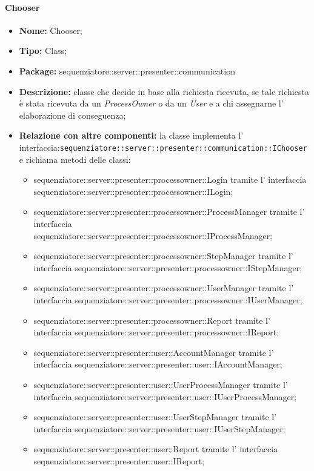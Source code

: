 \paragraph{Chooser}
	\begin{itemize}
		\item \textbf{Nome:} Chooser;
		\item \textbf{Tipo:} Class;
		\item \textbf{Package:} sequenziatore::server::presenter::communication
		\item \textbf{Descrizione:} classe che decide in base alla richiesta ricevuta, se tale richiesta è stata ricevuta da un \textit{ProcessOwner} o da un \textit{User} e a chi assegnarne l' elaborazione di conseguenza;
		\item \textbf{Relazione con altre componenti:} la classe implementa l' interfaccia:\texttt{sequenziatore::server::presenter::communication::IChooser} e richiama metodi delle classi:
		\begin{itemize}
			\item sequenziatore::server::presenter::processowner::Login tramite l' interfaccia sequenziatore::server::presenter::processowner::ILogin;
			\item sequenziatore::server::presenter::processowner::ProcessManager tramite l' interfaccia sequenziatore::server::presenter::processowner::IProcessManager;
			\item sequenziatore::server::presenter::processowner::StepManager tramite l' interfaccia sequenziatore::server::presenter::processowner::IStepManager;
			\item sequenziatore::server::presenter::processowner::UserManager tramite l' interfaccia sequenziatore::server::presenter::processowner::IUserManager;
			\item sequenziatore::server::presenter::processowner::Report tramite l' interfaccia
sequenziatore::server::presenter::processowner::IReport;
			\item sequenziatore::server::presenter::user::AccountManager tramite l' interfaccia			sequenziatore::server::presenter::user::IAccountManager;
			\item sequenziatore::server::presenter::user::UserProcessManager tramite l' interfaccia sequenziatore::server::presenter::user::IUserProcessManager;
			\item sequenziatore::server::presenter::user::UserStepManager tramite l' interfaccia sequenziatore::server::presenter::user::IUserStepManager;
			\item sequenziatore::server::presenter::user::Report tramite l' interfaccia sequenziatore::server::presenter::user::IReport;
		\end{itemize}
	\end{itemize}